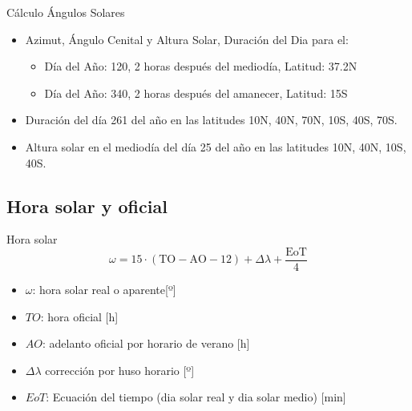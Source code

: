 \documentclass[xcolor={usenames,svgnames,dvipsnames}]{beamer}
\begin{document}
\begin{frame}[label={sec:org1f27159}]{Cálculo Ángulos Solares}
\begin{itemize}
\item Azimut, Ángulo Cenital y Altura Solar, Duración del Dia para el:

\begin{itemize}
\item Día del Año: 120, 2 horas después del mediodía, Latitud: 37.2N

\item Día del Año: 340, 2 horas después del amanecer, Latitud: 15S
\end{itemize}

\item Duración del día 261 del año en las latitudes 10N, 40N, 70N, 10S,
40S, 70S.

\item Altura solar en el mediodía del día 25 del año en las latitudes 10N,
40N, 10S, 40S.
\end{itemize}
\end{frame}

\subsection{Hora solar y oficial}
\label{sec:orgde98d4b}
\begin{frame}[label={sec:org93fef90}]{Hora solar}
\[\omega=15\cdot(\mathrm{TO}-\mathrm{AO}-12)+\Delta\lambda+\frac{\mathrm{EoT}}{4}\]

\begin{itemize}
\item \(\omega\): hora solar real o aparente[º]
\item \(TO\): hora oficial [h]
\item \(AO\): adelanto oficial por horario de verano [h]
\item \(\Delta\lambda\) corrección por huso horario [º]
\item \(EoT\): Ecuación del tiempo (dia solar real y dia solar medio) [min]
\end{itemize}
\end{frame}
\end{document}
